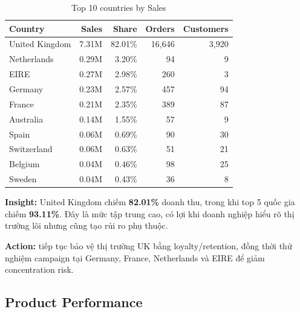 \documentclass[11pt,a4paper]{article}
\begin{document}
\begin{table}[H]
\centering
\caption{Top 10 countries by Sales}
\begin{tabular}{lrrrr}
\toprule
\textbf{Country} & \textbf{Sales} & \textbf{Share} & \textbf{Orders} & \textbf{Customers} \\
\midrule
United Kingdom & 7.31M & 82.01\% & 16,646 & 3,920 \\
Netherlands & 0.29M & 3.20\% & 94 & 9 \\
EIRE & 0.27M & 2.98\% & 260 & 3 \\
Germany & 0.23M & 2.57\% & 457 & 94 \\
France & 0.21M & 2.35\% & 389 & 87 \\
Australia & 0.14M & 1.55\% & 57 & 9 \\
Spain & 0.06M & 0.69\% & 90 & 30 \\
Switzerland & 0.06M & 0.63\% & 51 & 21 \\
Belgium & 0.04M & 0.46\% & 98 & 25 \\
Sweden & 0.04M & 0.43\% & 36 & 8 \\
\bottomrule
\end{tabular}
\end{table}

\textbf{Insight:} United Kingdom chiếm \textbf{82.01\%} doanh thu, trong khi top 5 quốc gia chiếm \textbf{93.11\%}. Đây là mức tập trung cao, có lợi khi doanh nghiệp hiểu rõ thị trường lõi nhưng cũng tạo rủi ro phụ thuộc.

\textbf{Action:} tiếp tục bảo vệ thị trường UK bằng loyalty/retention, đồng thời thử nghiệm campaign tại Germany, France, Netherlands và EIRE để giảm concentration risk.

\subsection{Product Performance}
\end{document}
